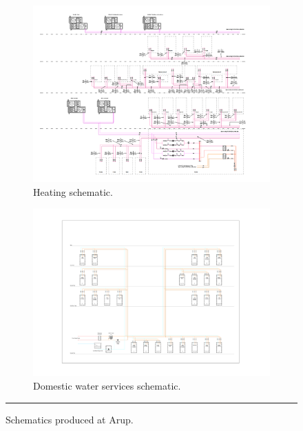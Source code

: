 \begin{figure}[htbp]
	\begin{subfigure}[b]{.48\textwidth}
		\centering
		\includegraphics[width=\textwidth]{figures/HeatingSchem.PNG}
		\caption[Arup heating schematic.]{Heating schematic.}\label{fig:heating}
	\end{subfigure}
	\begin{subfigure}[b]{.48\textwidth}
		\centering
		\includegraphics[width=\textwidth]{figures/DomesticsSchem.pdf}
		\caption[Arup domestic schematic.]{Domestic water services schematic.}\label{fig:domestic}
	\end{subfigure}
	\rule{\textwidth}{0.5pt} %
	\caption{Schematics produced at Arup.}
	\label{fig:arup_schematics}
\end{figure}